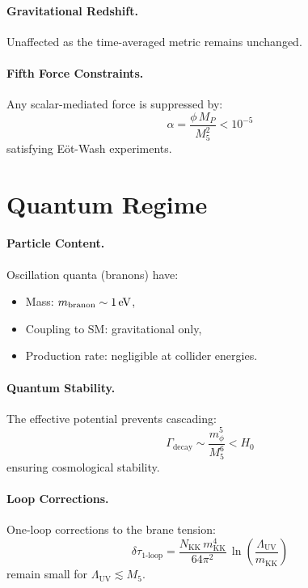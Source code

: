 \paragraph{Gravitational Redshift.} Unaffected as the time-averaged metric remains unchanged.

\paragraph{Fifth Force Constraints.}
Any scalar-mediated force is suppressed by:
\begin{equation}
\alpha = \frac{\phi\,M_P}{M_5^2} < 10^{-5}
\end{equation}
satisfying E\"ot-Wash experiments.

\section{Quantum Regime}
\label{sec:quantum_regime}

\paragraph{Particle Content.}
Oscillation quanta (branons) have:
\begin{itemize}
  \item Mass: $m_\text{branon} \sim 1\,\text{eV}$,
  \item Coupling to SM: gravitational only,
  \item Production rate: negligible at collider energies.
\end{itemize}

\paragraph{Quantum Stability.}
The effective potential prevents cascading:
\begin{equation}
\Gamma_\text{decay} \sim \frac{m_\phi^5}{M_5^6} < H_0
\end{equation}
ensuring cosmological stability.

\paragraph{Loop Corrections.}
One-loop corrections to the brane tension:
\begin{equation}
\delta\tau_\text{1-loop} = \frac{N_\text{KK}\,m_\text{KK}^4}{64\pi^2}\,\ln\!\left(\frac{\Lambda_\text{UV}}{m_\text{KK}}\right)
\end{equation}
remain small for $\Lambda_\text{UV} \lesssim M_5$.

